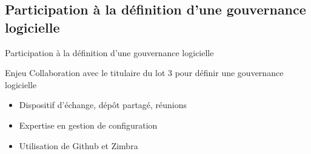 \subsection{Participation à la définition d'une gouvernance logicielle}
\begin{frame}{\normalsize Participation à la définition d'une gouvernance logicielle}
			\begin{block}{Enjeu}
				Collaboration avec le titulaire du lot \no{}3 pour définir une gouvernance logicielle
			\end{block}
			\begin{itemize}
				\item Dispositif d'échange, dépôt partagé, réunions
				\item Expertise en gestion de configuration
				\item Utilisation de Github et Zimbra
			\end{itemize}
\end{frame}